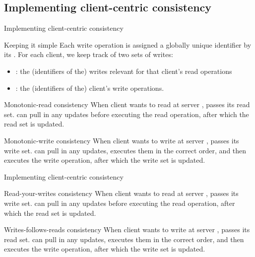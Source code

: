 \subsection{Implementing client-centric consistency}
\begin{slide}{Implementing client-centric consistency}
  
  \begin{block}{Keeping it simple}
    Each write operation  is assigned a globally unique identifier by its . For each
    client, we keep track of two sets of writes:
    \begin{itemize}
    \item {}: the (identifiers of the) writes relevant for that client's read operations
    \item {}: the (identifiers of the) client's write operations.
    \end{itemize}
  \end{block}

  \begin{block}{Monotonic-read consistency}
    When client  wants to read at server ,  passes its read set.  can pull in any
    updates before executing the read operation, after which the read set is updated.
  \end{block}

  \begin{block}{Monotonic-write consistency}
    When client  wants to write at server ,  passes its write set.  can pull in any
    updates, executes them in the correct order, and then executes the write operation, after which the write
    set is updated.
  \end{block}

\end{slide}
\begin{slide}{Implementing client-centric consistency}
  
  \begin{block}{Read-your-writes consistency}
    When client  wants to read at server ,  passes its write set.  can pull in any
    updates before executing the read operation, after which the read set is updated.
  \end{block}

  \begin{block}{Writes-follows-reads consistency}
    When client  wants to write at server ,  passes its read set.  can pull in any
    updates, executes them in the correct order, and then executes the write operation, after which the write
    set is updated.
  \end{block}

\end{slide}
